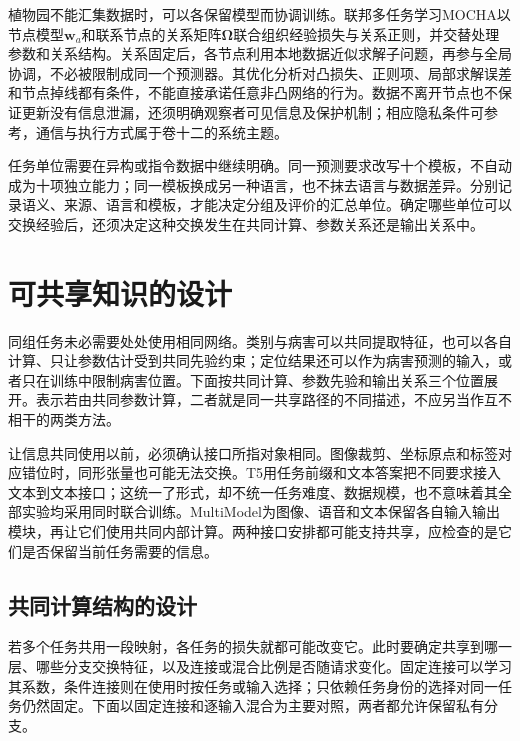 植物园不能汇集数据时，可以各保留模型而协调训练。联邦多任务学习MOCHA以节点模型$\bm w_a$和联系节点的关系矩阵$\bm\Omega$联合组织经验损失与关系正则，并交替处理参数和关系结构。关系固定后，各节点利用本地数据近似求解子问题，再参与全局协调，不必被限制成同一个预测器。其优化分析对凸损失、正则项、局部求解误差和节点掉线都有条件，不能直接承诺任意非凸网络的行为。数据不离开节点也不保证更新没有信息泄漏，还须明确观察者可见信息及保护机制；相应隐私条件可参考，通信与执行方式属于卷十二的系统主题。

任务单位需要在异构或指令数据中继续明确。同一预测要求改写十个模板，不自动成为十项独立能力；同一模板换成另一种语言，也不抹去语言与数据差异。分别记录语义、来源、语言和模板，才能决定分组及评价的汇总单位。确定哪些单位可以交换经验后，还须决定这种交换发生在共同计算、参数关系还是输出关系中。

\section{可共享知识的设计}
\label{sec:ket-sharing-structure}

同组任务未必需要处处使用相同网络。类别与病害可以共同提取特征，也可以各自计算、只让参数估计受到共同先验约束；定位结果还可以作为病害预测的输入，或者只在训练中限制病害位置。下面按共同计算、参数先验和输出关系三个位置展开。表示若由共同参数计算，二者就是同一共享路径的不同描述，不应另当作互不相干的两类方法。

让信息共同使用以前，必须确认接口所指对象相同。图像裁剪、坐标原点和标签对应错位时，同形张量也可能无法交换。T5用任务前缀和文本答案把不同要求接入文本到文本接口；这统一了形式，却不统一任务难度、数据规模，也不意味着其全部实验均采用同时联合训练。MultiModel为图像、语音和文本保留各自输入输出模块，再让它们使用共同内部计算。两种接口安排都可能支持共享，应检查的是它们是否保留当前任务需要的信息。

\subsection{共同计算结构的设计}
\label{sec:ket-sharing-computation}

若多个任务共用一段映射，各任务的损失就都可能改变它。此时要确定共享到哪一层、哪些分支交换特征，以及连接或混合比例是否随请求变化。固定连接可以学习其系数，条件连接则在使用时按任务或输入选择；只依赖任务身份的选择对同一任务仍然固定。下面以固定连接和逐输入混合为主要对照，两者都允许保留私有分支。

